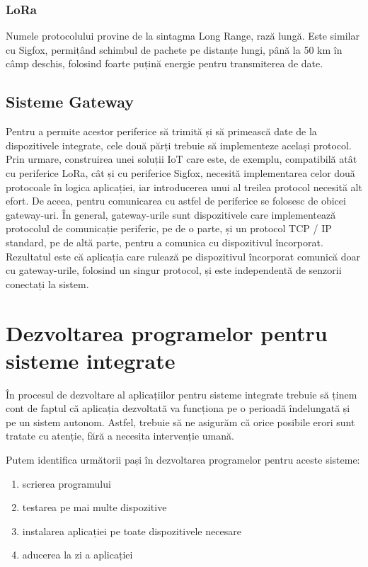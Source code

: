 \subsubsection{LoRa}
\label{sec:embed:bus:wireless:lora}

Numele protocolului provine de la sintagma Long Range, rază lungă. Este similar cu
Sigfox, permițând schimbul de pachete pe distanțe lungi, până la 50 km în câmp
deschis, folosind foarte puțină energie pentru transmiterea de date.

\subsection{Sisteme Gateway}
\label{sec:embed:bus:gateway}

Pentru a permite acestor periferice să trimită și să primească date de la
dispozitivele integrate, cele două părți trebuie să implementeze același
protocol. Prin urmare, construirea unei soluții IoT care este, de exemplu,
compatibilă atât cu periferice LoRa, cât și cu periferice Sigfox, necesită implementarea celor
două protocoale în logica aplicației, iar introducerea unui al treilea protocol
necesită alt efort. De aceea, pentru comunicarea cu astfel de
periferice se folosesc de obicei gateway-uri. În general, gateway-urile sunt
dispozitivele care implementează protocolul de comunicație periferic, pe de o
parte, și un protocol TCP / IP standard, pe de altă parte, pentru a comunica cu
dispozitivul încorporat. Rezultatul este că aplicația care rulează pe
dispozitivul încorporat comunică doar cu gateway-urile, folosind un singur
protocol, și este independentă de senzorii conectați la sistem.

\section{Dezvoltarea programelor pentru sisteme integrate}
\label{sec:embed:dev}

În procesul de dezvoltare al aplicațiilor pentru sisteme integrate trebuie să
ținem cont de faptul că aplicația dezvoltată va funcționa pe o perioadă
îndelungată și pe un sistem autonom. Astfel, trebuie să ne asigurăm că orice
posibile erori sunt tratate cu atenție, fără a necesita intervenție umană.

Putem identifica următorii pași în dezvoltarea programelor pentru aceste
sisteme:

\begin{enumerate}
	\item scrierea programului
	\item testarea pe mai multe dispozitive
	\item instalarea aplicației pe toate dispozitivele necesare
	\item aducerea la zi a aplicației
\end{enumerate}

